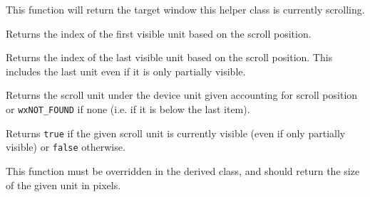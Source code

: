 
This function will return the target window this helper class is currently
scrolling.




\label{wxvarscrollhelperbasegetvisiblebegin}


Returns the index of the first visible unit based on the scroll position.


\label{wxvarscrollhelperbasegetvisibleend}


Returns the index of the last visible unit based on the scroll position. This
includes the last unit even if it is only partially visible.


\label{wxvarscrollhelperbasehittest}


Returns the scroll unit under the device unit given accounting for scroll
position or {\tt wxNOT\_FOUND} if none (i.e. if it is below the last item).


\label{wxvarscrollhelperbaseisvisible}


Returns {\tt true} if the given scroll unit is currently visible (even if only
partially visible) or {\tt false} otherwise.


\label{wxvarscrollhelperbaseongetunitsize}


This function must be overridden in the derived class, and should return the
size of the given unit in pixels.


\label{wxvarscrollhelperbaseongetunitssizehint}


